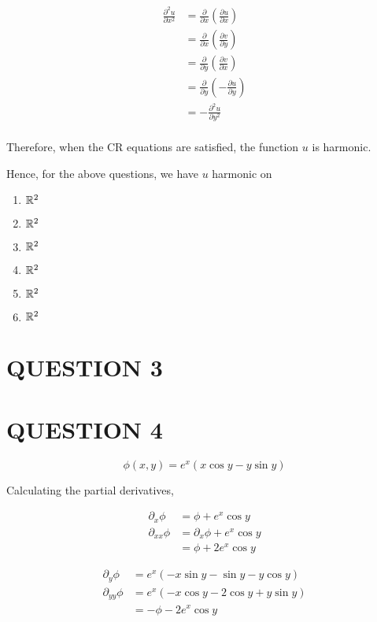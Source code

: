 \documentclass[a4paper]{article}
\begin{document}
\begin{align*}
\frac{\partial^{2} u}{\partial x^{2}} & = \frac{\partial }{\partial x} \left(  \frac{\partial u }{\partial x} \right)  \\
& = \frac{\partial }{\partial x} \left(  \frac{\partial v }{\partial y} \right)\\
& = \frac{\partial }{\partial y} \left(  \frac{\partial v }{\partial x} \right)\\
& = \frac{\partial }{\partial y} \left(  - \frac{\partial u }{\partial y} \right)\\
& =  - \frac{\partial^{2} u }{\partial y^{2}}  \\
\end{align*}

Therefore, when the CR equations are satisfied, the function $ u $ is harmonic.

Hence, for the above questions, we have $ u $ harmonic on

\begin{enumerate}
	\item $ \mathbb{R}^{2} $
	\item $ \mathbb{R}^{2} $
	\item $ \mathbb{R}^{2} $
	\item $ \mathbb{R}^{2} $
	\item $ \mathbb{R}^{2} $
	\item $ \mathbb{R}^{2} $
	
\end{enumerate}

\section{QUESTION 3}
\section{QUESTION 4}

\[ \phi(x,y) = e^{x}(x \cos y - y \sin y) \]

Calculating the partial derivatives,

\begin{align*}
\partial_{x} \phi & = \phi + e^{x}\cos y \\
\partial_{xx} \phi & = \partial_{x} \phi +  e^{x}\cos y  \\
& = \phi + 2 e^{x}\cos y
\end{align*}



\begin{align*}
\partial_{y} \phi & = e^{x}(-x \sin y - \sin y - y \cos y) \\
\partial_{yy} \phi & = e^{x}(-x \cos y - 2\cos y + y \sin y ) \\
& = - \phi - 2 e^{x}\cos y
\end{align*}
\end{document}
